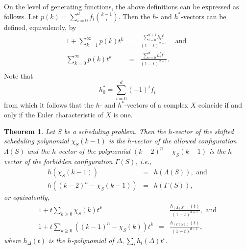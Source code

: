 \documentclass[12pt,reqno]{amsart}
\numberwithin{definition}{section}
\newtheorem{theorem}[definition]{Theorem}
\theoremstyle{definition}
\newcommand{\ehr}{\operatorname{ehr}}
\newcommand{\allow}{\Lambda} %
\newcommand{\poly}{\chi} %
\newcommand{\forb}{\Gamma} %
\begin{document}


On the level of generating functions, the above definitions can be expressed as follows. Let $p(k)=\sum_{i=0}^{d} f_i \binom{k-1}{i}$. Then the $h$- and $h^*$-vectors can be defined, equivalently, by 
\begin{eqnarray*}
1 + \sum_{k=1}^\infty p(k) t^k & = &  \frac{\sum_{i=0}^{d+1}h_i t^i}{(1-t)^{d+1}} \;\;\; \text{ and } \\
\sum_{k=0}^\infty p(k) t^k & = &  \frac{\sum_{i=0}^{d}h^*_i t^i}{(1-t)^{d+1}}. \\
\end{eqnarray*}
 Note that 
\[ 
h^*_0=\sum_{i=0}^d (-1)^i f_i
\]
from which it follows that the $h$- and $h^*$-vectors of a complex $X$ coincide if and only if the Euler characteristic of $X$ is one.



\begin{theorem}
\label{hilbert}
Let $S$ be a scheduling problem. Then the $h$-vector of the shifted scheduling polynomial $\poly_S(k-1)$ is the $h$-vector of the allowed configuration $\allow(S)$ and the $h$-vector of the polynomial $(k-2)^n-\poly_S(k-1)$ is the $h$-vector of the forbidden configuration $\forb(S)$, i.e.,
\begin{eqnarray*}
  h(\poly_S(k-1)) &=& h(\allow(S)),   \text{ and}\\
  h((k-2)^n - \poly_S(k-1)) &=& h(\forb(S)),
\end{eqnarray*}
or equivalently,
\begin{eqnarray*}
 1 + t\sum_{k \geq 0} \poly_S(k) t^k &=& \frac{ h_{(\allow(S))}(t)}{(1-t)^{d+1}}, \text{ and} \\
 1 + t\sum_{k \geq 0} \left( (k-1)^n - \poly_S(k) \right) t^k &=& \frac{ h_{(\forb(S))} (t)}{(1-t)^{d+1}},
\end{eqnarray*}
where $h_{\Delta}(t)$ is the $h$-polynomial of ${\Delta}, \sum_{i} h_i(\Delta) t^i$.
\end{theorem}
\end{document}
